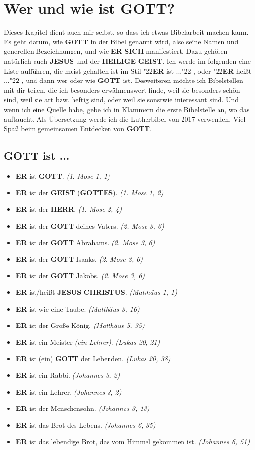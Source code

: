 \documentclass[10pt,a5paper]{article}
\newcommand{\Christus}[0]{\textbf{CHRISTUS}}
\newcommand{\Er}[0]{\textbf{ER}}
\newcommand{\Geist}[0]{\textbf{GEIST}}
\newcommand{\Gottes}[0]{\textbf{GOTTES}}
\newcommand{\Gott}[0]{\textbf{GOTT}}
\newcommand{\Heilige}[0]{\textbf{HEILIGE}}
\newcommand{\Herr}[0]{\textbf{HERR}}
\newcommand{\Jesus}[0]{\textbf{JESUS}}
\newcommand{\Sich}[0]{\textbf{SICH}}
\newcommand{\q}[1]{\char"22{#1}\char"22 }
\begin{document}
	\newpage
	\section{Wer und wie ist {\Gott}?}
		Dieses Kapitel dient auch mir selbst,
		so dass ich etwas Bibelarbeit machen kann.
		Es geht darum,
		wie {\Gott} in der Bibel genannt wird,
		also seine Namen und generellen Bezeichnungen,
		und wie {\Er} {\Sich} manifestiert.
		Dazu geh\"oren nat\"urlich auch {\Jesus} und der {\Heilige} {\Geist}.
		Ich werde im folgenden eine Liste auff\"uhren,
		die meist gehalten ist im Stil \q{{\Er} ist ...},
		oder \q{{\Er} hei{\ss}t ...},
		und dann wer oder wie {\Gott} ist.
		Desweiteren m\"ochte ich Bibelstellen mit dir teilen,
		die ich besonders erw\"ahnenswert finde,
		weil sie besonders sch\"on sind,
		weil sie art bzw. heftig sind,
		oder weil sie sonstwie interessant sind.
		Und wenn ich eine Quelle habe,
		gebe ich in Klammern die erste Bibelstelle an,
		wo das auftaucht.
		Als \"Ubersetzung werde ich die Lutherbibel von 2017 verwenden.
		Viel Spa{\ss} beim gemeinsamen Entdecken von {\Gott}.
	
	\subsection{{\Gott} ist ...}
		\begin{itemize}[nosep]
			\item {\Er} ist {\Gott}. \textit{(1. Mose 1, 1)}
			\item {\Er} ist der {\Geist} ({\Gottes}). \textit{(1. Mose 1, 2)}
			\item {\Er} ist der {\Herr}. \textit{(1. Mose 2, 4)}
			\item {\Er} ist der {\Gott} deines Vaters. \textit{(2. Mose 3, 6)}
			\item {\Er} ist der {\Gott} Abrahams. \textit{(2. Mose 3, 6)}
			\item {\Er} ist der {\Gott} Isaaks. \textit{(2. Mose 3, 6)}
			\item {\Er} ist der {\Gott} Jakobs. \textit{(2. Mose 3, 6)}
			\item {\Er} ist/hei{\ss}t {\Jesus} {\Christus}. \textit{(Matth\"aus 1, 1)}
			\item {\Er} ist wie eine Taube. \textit{(Matth\"aus 3, 16)}
			\item {\Er} ist der Gro{\ss}e K\"onig. \textit{(Matth\"aus 5, 35)}
			\item {\Er} ist ein Meister \textit{(ein Lehrer)}. \textit{(Lukas 20, 21)}
			\item {\Er} ist (ein) {\Gott} der Lebenden. \textit{(Lukas 20, 38)}		
			\item {\Er} ist ein Rabbi. \textit{(Johannes 3, 2)}
			\item {\Er} ist ein Lehrer. \textit{(Johannes 3, 2)}
			\item {\Er} ist der Menschensohn. \textit{(Johannes 3, 13)}
			\item {\Er} ist das Brot des Lebens. \textit{(Johannes 6, 35)}
			\item {\Er} ist das lebendige Brot, das vom Himmel gekommen ist. \textit{(Johannes 6, 51)}
		\end{itemize}
\end{document}
